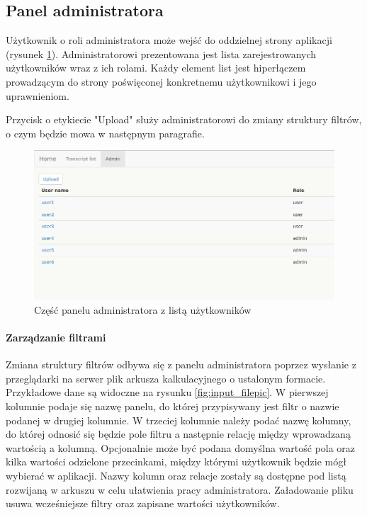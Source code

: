 \documentclass[a4paper,12pt,twoside]{article}
\begin{document}
\newpage
\subsection{Panel administratora}
Użytkownik o roli administratora może wejść do oddzielnej strony aplikacji (rysunek \ref{fig:adminpic}). Administratorowi prezentowana jest lista zarejestrowanych użytkowników wraz z ich rolami. Każdy element list jest hiperłączem prowadzącym
do strony poświęconej konkretnemu użytkownikowi i jego uprawnieniom.

Przycisk o etykiecie "Upload" służy administratorowi do zmiany struktury 
filtrów, o czym będzie mowa w następnym paragrafie.


\begin{figure}[h]
  \centering
  \includegraphics[width=\textwidth]{obrazy/aplikacja/admin.png}
  \caption{Część panelu administratora z listą użytkowników}
  \label{fig:adminpic}
\end{figure}

\newpage
\paragraph{Zarządzanie filtrami}

Zmiana struktury filtrów odbywa się z panelu administratora poprzez wysłanie
z przeglądarki na serwer plik arkusza kalkulacyjnego o ustalonym formacie. Przykładowe dane są widoczne na rysunku \ref{fig:input_filepic}.
W pierwszej kolumnie podaje się nazwę panelu, do której przypisywany
jest filtr o nazwie podanej w drugiej kolumnie. W trzeciej kolumnie należy podać nazwę kolumny, do której
odnosić się będzie pole filtru a następnie relację między wprowadzaną wartością a kolumną.
Opcjonalnie może być podana domyślna wartość pola oraz kilka wartości odzielone przecinkami, między którymi użytkownik będzie mógł wybierać w aplikacji. Nazwy kolumn oraz relacje zostały są dostępne pod
listą rozwijaną w arkuszu w celu ułatwienia pracy administratora. 
Załadowanie pliku usuwa wcześniejsze filtry oraz zapisane wartości użytkowników. 
 
\end{document}
